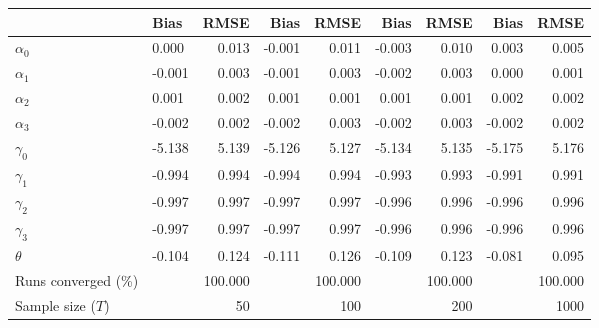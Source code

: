 
\begin{tabular}[t]{llrrrrrrr}
\toprule
  & Bias & RMSE & Bias & RMSE & Bias & RMSE & Bias & RMSE\\
\midrule
$\alpha_{0}$ & 0.000 & 0.013 & -0.001 & 0.011 & -0.003 & 0.010 & 0.003 & 0.005\\
$\alpha_{1}$ & -0.001 & 0.003 & -0.001 & 0.003 & -0.002 & 0.003 & 0.000 & 0.001\\
$\alpha_{2}$ & 0.001 & 0.002 & 0.001 & 0.001 & 0.001 & 0.001 & 0.002 & 0.002\\
$\alpha_{3}$ & -0.002 & 0.002 & -0.002 & 0.003 & -0.002 & 0.003 & -0.002 & 0.002\\
$\gamma_{0}$ & -5.138 & 5.139 & -5.126 & 5.127 & -5.134 & 5.135 & -5.175 & 5.176\\
$\gamma_{1}$ & -0.994 & 0.994 & -0.994 & 0.994 & -0.993 & 0.993 & -0.991 & 0.991\\
$\gamma_{2}$ & -0.997 & 0.997 & -0.997 & 0.997 & -0.996 & 0.996 & -0.996 & 0.996\\
$\gamma_{3}$ & -0.997 & 0.997 & -0.997 & 0.997 & -0.996 & 0.996 & -0.996 & 0.996\\
$\theta$ & -0.104 & 0.124 & -0.111 & 0.126 & -0.109 & 0.123 & -0.081 & 0.095\\
Runs converged (\%) &  & 100.000 &  & 100.000 &  & 100.000 &  & 100.000\\
Sample size ($T$) &  & 50 &  & 100 &  & 200 &  & 1000\\
\bottomrule
\end{tabular}
